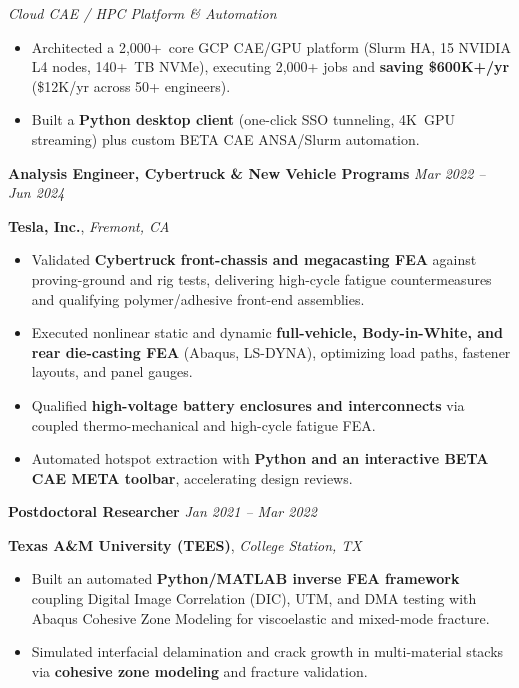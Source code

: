 \documentclass[10pt,letterpaper]{article}
\newcommand{\roleheader}[4]{%
  \vspace{3pt}
  \noindent\textbf{#2} \hfill \textit{#4}\par
  \noindent\textbf{#1}, \textit{#3}\par
  \vspace{1pt}
}
\newcommand{\subhead}[1]{%
  \vspace{1.5pt}\noindent\textit{#1}\par\vspace{0.5pt}
}
\begin{document}
\subhead{Cloud CAE / HPC Platform \& Automation}
\begin{itemize}
  \item Architected a 2,000+~core GCP CAE/GPU platform (Slurm HA, 15 NVIDIA L4 nodes, 140+~TB NVMe), executing 2,000+ jobs and \textbf{saving \$600K+/yr} (\$12K/yr across 50+ engineers).
  \item Built a \textbf{Python desktop client} (one-click SSO tunneling, 4K~GPU streaming) plus custom BETA CAE ANSA/Slurm automation.
\end{itemize}

\roleheader{Tesla, Inc.}{Analysis Engineer, Cybertruck \& New Vehicle Programs}{Fremont, CA}{Mar 2022 -- Jun 2024}
\begin{itemize}
  \item Validated \textbf{Cybertruck front-chassis and megacasting FEA} against proving-ground and rig tests, delivering high-cycle fatigue countermeasures and qualifying polymer/adhesive front-end assemblies.
  \item Executed nonlinear static and dynamic \textbf{full-vehicle, Body-in-White, and rear die-casting FEA} (Abaqus, LS-DYNA), optimizing load paths, fastener layouts, and panel gauges.
  \item Qualified \textbf{high-voltage battery enclosures and interconnects} via coupled thermo-mechanical and high-cycle fatigue FEA.
  \item Automated hotspot extraction with \textbf{Python and an interactive BETA CAE META toolbar}, accelerating design reviews.
\end{itemize}

\roleheader{Texas A\&M University (TEES)}{Postdoctoral Researcher}{College Station, TX}{Jan 2021 -- Mar 2022}
\begin{itemize}
  \item Built an automated \textbf{Python/MATLAB inverse FEA framework} coupling Digital Image Correlation (DIC), UTM, and DMA testing with Abaqus Cohesive Zone Modeling for viscoelastic and mixed-mode fracture.
  \item Simulated interfacial delamination and crack growth in multi-material stacks via \textbf{cohesive zone modeling} and fracture validation.
\end{itemize}

\end{document}
